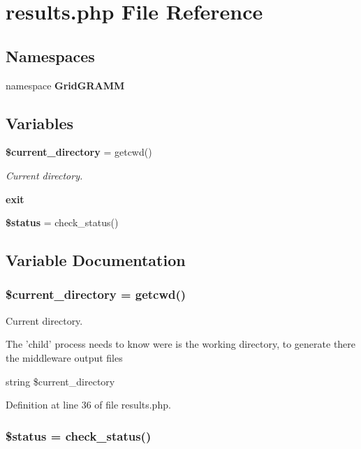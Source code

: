 \section{results.php File Reference}
\label{results_8php}
\subsection*{Namespaces}
\begin{CompactItemize}
\item 
namespace {\bf Grid\-GRAMM}
\end{CompactItemize}
\subsection*{Variables}
\begin{CompactItemize}
\item 
{\bf \$current\_\-directory} = getcwd()
\begin{CompactList}\small\item\em Current directory. \item\end{CompactList}\item 
{\bf exit}
\item 
{\bf \$status} = check\_\-status()
\end{CompactItemize}


\subsection{Variable Documentation}
\subsubsection{\setlength{\rightskip}{0pt plus 5cm}\$current\_\-directory = getcwd()}\label{results_8php_a0}


Current directory. 

The 'child' process needs to know were is the working directory, to generate there the middleware output files

string \$current\_\-directory 

Definition at line 36 of file results.php.
\subsubsection{\setlength{\rightskip}{0pt plus 5cm}\$status = check\_\-status()}\label{results_8php_a2}




